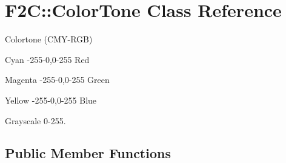 \hypertarget{class_f2_c_1_1_color_tone}{
\section{F2C::ColorTone Class Reference}
\label{class_f2_c_1_1_color_tone}
}


Colortone (CMY-\/RGB) \par
 Cyan -\/255-\/0,0-\/255 Red \par
 Magenta -\/255-\/0,0-\/255 Green \par
 Yellow -\/255-\/0,0-\/255 Blue \par
 Grayscale 0-\/255.  


\subsection*{Public Member Functions}
